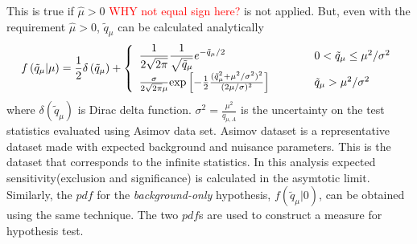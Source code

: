 \begin{itemize}
This is true if $\hat{\mu}>0$ \textcolor{red}{WHY not equal sign here?} 
is not applied. But, even with the requirement $\hat{\mu}>0$, 
$\tilde{q}_\mu$ can be calculated analytically
\begin{eqnarray} 
f\left( \tilde{q}_\mu | \mu \right) 
= 
\frac{1}{2} \delta \left( \tilde{q}_\mu \right)  + 
\left\{ \begin{array}{l l}
\displaystyle
\frac{1}{2\sqrt{2\pi}} \frac{1}{\sqrt{\tilde{q}_\mu}}  e^{-\tilde{q}_\mu/2}
   & \quad \quad \quad 0 < \tilde{q}_\mu \le \mu^2/\sigma^2 \\
\frac{\sigma}{2\sqrt{2\pi}\mu} 
   \textrm{exp}\left[-\frac{1}{2} \frac{(\tilde{q}_\mu^2+\mu^2/\sigma^2)^2}{(2\mu/\sigma)^2}   \right]
   & \quad \quad \quad \tilde{q}_\mu > \mu^2/\sigma^2 
\end{array} \right.
\end{eqnarray} 
where $\delta(\tilde{q}_\mu)$ is Dirac delta function.
$\displaystyle \sigma^2 = \frac{\mu^2}{q_{\mu,A}}$ 
is the uncertainty on the test statistics evaluated using Asimov data set. 
Asimov dataset is a representative dataset made with expected background 
and nuisance parameters. This is the dataset that corresponds to the infinite statistics. 
In this analysis expected sensitivity(exclusion and significance) is calculated 
in the asymtotic limit.
Similarly, the $pdf$ for the \textit{background-only} hypothesis,
$f\left( \tilde{q}_\mu | 0 \right)$, can be obtained 
using the same technique. The two $pdf$s are used to construct 
a measure for hypothesis test.


\end{itemize}
